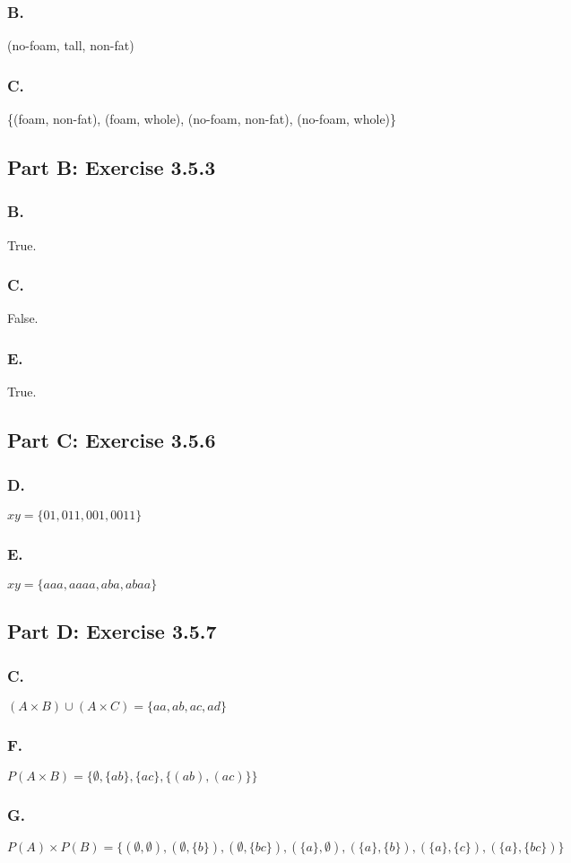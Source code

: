 \documentclass[titlepage]{article}\pagestyle{empty}
\begin{document}
\subsubsection*{B.} (no-foam, tall, non-fat)
\subsubsection*{C.} \{(foam, non-fat), (foam, whole), (no-foam, non-fat), (no-foam, whole)\}
\subsection*{Part B: Exercise 3.5.3}
\subsubsection*{B.} True.
\subsubsection*{C.}	False.
\subsubsection*{E.} True.
\subsection*{Part C: Exercise 3.5.6} 
\subsubsection*{D.} $xy = \{01, 011, 001, 0011\}$
\subsubsection*{E.} $xy = \{aaa, aaaa, aba, abaa\}$
\subsection*{Part D: Exercise 3.5.7} 
\subsubsection*{C.} $(A \times B) \cup (A \times C) = \{aa,ab,ac,ad\}$
\subsubsection*{F.} $P(A \times B) = \{\emptyset, \{ab\}, \{ac\}, \{(ab),(ac)\}\}$
\subsubsection*{G.} $P(A) \times P(B) = \{(\emptyset, \emptyset), (\emptyset, \{b\}), (\emptyset, \{bc\}), (\{a\}, \emptyset), (\{a\},\{b\}), (\{a\},\{c\}), (\{a\},\{bc\})\}$
\end{document}
